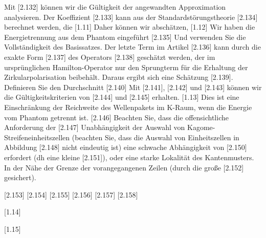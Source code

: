 \documentclass[
aps,
prl,
groupedaddress,
superscriptaddress,
floatfix,
notitlepage
]{revtex4-1}
\begin{document}
Mit [2.132] können wir die Gültigkeit der angewandten Approximation analysieren.
Der Koeffizient [2.133] kann aus der Standardstörungstheorie [2.134] berechnet werden, die
[1.11]
Daher können wir abschätzen,
[1.12]
Wir haben die Energietrennung aus dem Phantom eingeführt [2.135]
Und verwenden Sie die Vollständigkeit des Basissatzes.
Der letzte Term im Artikel [2.136] kann durch die exakte Form [2.137] des Operators [2.138] geschätzt werden, der im ursprünglichen Hamilton-Operator nur den Sprungterm für die Erhaltung der Zirkularpolarisation beibehält.
Daraus ergibt sich eine Schätzung [2.139].
Definieren Sie den Durchschnitt
[2.140]
Mit [2.141], [2.142] und [2.143] können wir die Gültigkeitskriterien von [2.144] und [2.145] erhalten.
[1.13]
Dies ist eine Einschränkung der Reichweite des Wellenpakets im K-Raum, wenn die Energie vom Phantom getrennt ist.
[2.146]
Beachten Sie, dass die offensichtliche Anforderung der [2.147] Unabhängigkeit der Auswahl von Kagome-Streifeneinheitszellen (beachten Sie, dass die Auswahl von Einheitszellen in Abbildung [2.148] nicht eindeutig ist) eine schwache Abhängigkeit von [2.150] erfordert (dh eine kleine [2.151]), oder eine starke Lokalität des Kantenmusters.
In der Nähe der Grenze der vorangegangenen Zeilen (durch die große [2.152] gesichert).

[2.153]
[2.154]
[2.155]
[2.156]
[2.157]
[2.158]

[1.14]

[1.15]
\end{document}
